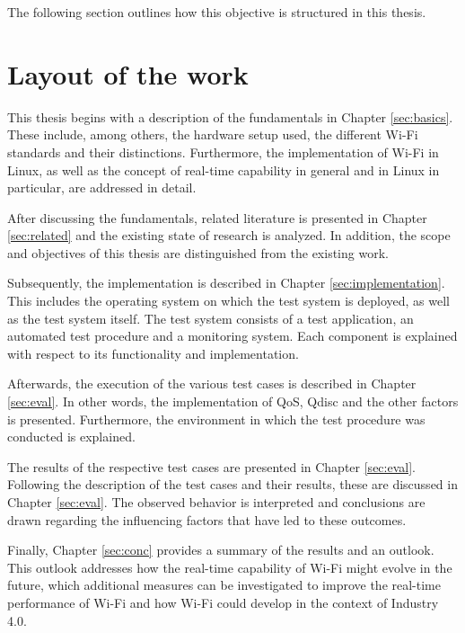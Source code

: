 The following section outlines how this objective is structured in this thesis.  

\section{Layout of the work}
This thesis begins with a description of the fundamentals in Chapter \ref{sec:basics}.  
These include, among others, the hardware setup used, the different Wi-Fi standards and their distinctions.  
Furthermore, the implementation of Wi-Fi in Linux, as well as the concept of real-time capability in general and in Linux in particular, are addressed in detail.  

After discussing the fundamentals, related literature is presented in Chapter \ref{sec:related} and the existing state of research is analyzed.  
In addition, the scope and objectives of this thesis are distinguished from the existing work.  

Subsequently, the implementation is described in Chapter \ref{sec:implementation}.  
This includes the operating system on which the test system is deployed, as well as the test system itself.  
The test system consists of a test application, an automated test procedure and a monitoring system.  
Each component is explained with respect to its functionality and implementation.  

Afterwards, the execution of the various test cases is described in Chapter \ref{sec:eval}.  
In other words, the implementation of \ac{QoS}, \ac{Qdisc} and the other factors is presented.  
Furthermore, the environment in which the test procedure was conducted is explained.  

The results of the respective test cases are presented in Chapter \ref{sec:eval}.  
Following the description of the test cases and their results, these are discussed in Chapter \ref{sec:eval}.  
The observed behavior is interpreted and conclusions are drawn regarding the influencing factors that have led to these outcomes.  

Finally, Chapter \ref{sec:conc} provides a summary of the results and an outlook.  
This outlook addresses how the real-time capability of Wi-Fi might evolve in the future, which additional measures can be investigated to improve the real-time performance of Wi-Fi and how Wi-Fi could develop in the context of Industry 4.0.  

